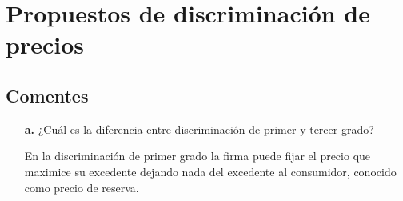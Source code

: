 
\section{Propuestos de discriminación de precios}

\subsection{Comentes}

\begin{itemize}
    \item[\textbf{a.}] ¿Cuál es la diferencia entre discriminación de primer y tercer grado?
    \begin{solution}
        En la discriminación de primer grado la firma puede fijar el precio que maximice su excedente dejando nada del excedente al consumidor, conocido como precio de reserva.


\end{solution}
\end{itemize}
